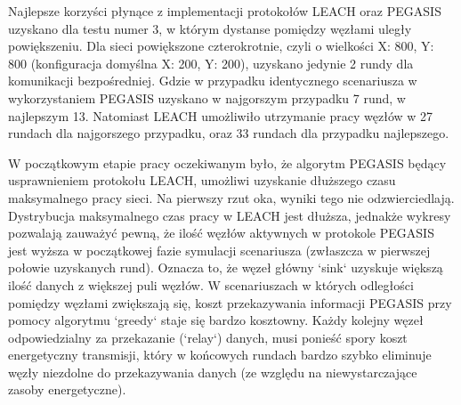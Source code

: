 \documentclass[a4paper,12pt,twoside,openany]{report}
\begin{document}
Najlepsze korzyści płynące z implementacji protokołów LEACH oraz PEGASIS uzyskano dla testu numer 3, w którym dystanse pomiędzy węzłami uległy powiększeniu.
Dla sieci powiększone czterokrotnie, czyli o wielkości X: 800, Y: 800 (konfiguracja domyślna X: 200, Y: 200), uzyskano jedynie 2 rundy dla komunikacji bezpośredniej.
Gdzie w przypadku identycznego scenariusza w wykorzystaniem PEGASIS uzyskano w najgorszym przypadku 7 rund, w najlepszym 13. Natomiast LEACH umożliwiło utrzymanie pracy węzłów 
w 27 rundach dla najgorszego przypadku, oraz 33 rundach dla przypadku najlepszego.
\par
W początkowym etapie pracy oczekiwanym było, że algorytm PEGASIS będący usprawnieniem protokołu LEACH, umożliwi uzyskanie dłuższego czasu maksymalnego pracy sieci.
Na pierwszy rzut oka, wyniki tego nie odzwierciedlają. Dystrybucja maksymalnego czas pracy w LEACH jest dłuższa, jednakże wykresy pozwalają zauważyć pewną, że ilość węzłów aktywnych
w protokole PEGASIS jest wyższa w początkowej fazie symulacji scenariusza (zwłaszcza w pierwszej połowie uzyskanych rund). Oznacza to, że węzeł główny `sink` uzyskuje większą ilość
danych z większej puli węzłów.
W scenariuszach w których odległości pomiędzy węzłami zwiększają się, koszt przekazywania informacji PEGASIS przy pomocy algorytmu `greedy` staje się bardzo kosztowny. Każdy kolejny węzeł
odpowiedzialny za przekazanie (`relay`) danych, musi ponieść spory koszt energetyczny transmisji, który w końcowych rundach bardzo szybko eliminuje węzły niezdolne do przekazywania danych
(ze względu na niewystarczające zasoby energetyczne).
\end{document}
